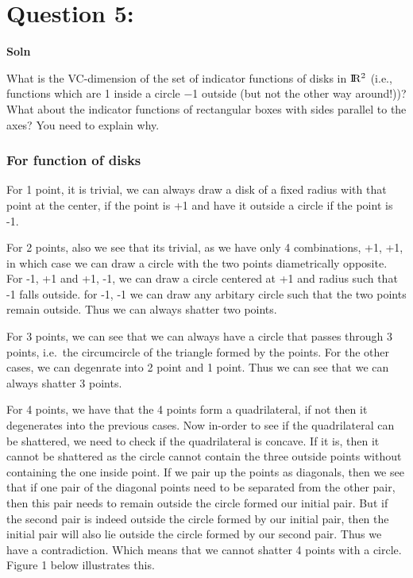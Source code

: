 \documentclass[11pt]{article}
\begin{document}
\clearpage

    \hypertarget{question-5}{%
\section{Question 5:}\label{question-5}}

\textbf{Soln}

What is the VC-dimension of the set of indicator functions of disks in
\(\rm I\!R^2\) (i.e., functions which are 1 inside a circle −1 outside
(but not the other way around!))? What about the indicator functions of
rectangular boxes with sides parallel to the axes? You need to explain
why.

\hypertarget{for-function-of-disks}{%
\subsubsection{For function of disks}\label{for-function-of-disks}}

For 1 point, it is trivial, we can always draw a disk of a fixed radius
with that point at the center, if the point is +1 and have it outside a
circle if the point is -1.

For 2 points, also we see that its trivial, as we have only 4
combinations, +1, +1, in which case we can draw a circle with the two
points diametrically opposite. For -1, +1 and +1, -1, we can draw a
circle centered at +1 and radius such that -1 falls outside. for -1, -1
we can draw any arbitary circle such that the two points remain outside.
Thus we can always shatter two points.

For 3 points, we can see that we can always have a circle that passes
through 3 points, i.e.~the circumcircle of the triangle formed by the
points. For the other cases, we can degenrate into 2 point and 1 point.
Thus we can see that we can always shatter 3 points.

For 4 points, we have that the 4 points form a quadrilateral, if not
then it degenerates into the previous cases. Now in-order to see if the
quadrilateral can be shattered, we need to check if the quadrilateral is
concave. If it is, then it cannot be shattered as the circle cannot
contain the three outside points without containing the one inside
point. If we pair up the points as diagonals, then we see that if one
pair of the diagonal points need to be separated from the other pair,
then this pair needs to remain outside the circle formed our initial
pair. But if the second pair is indeed outside the circle formed by our
initial pair, then the initial pair will also lie outside the circle
formed by our second pair. Thus we have a contradiction. Which means
that we cannot shatter 4 points with a circle. Figure 1 below illustrates this.
\end{document}
